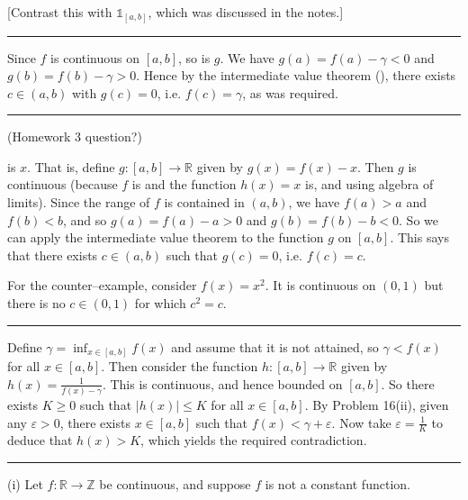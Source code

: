 \documentclass[letterpaper,10pt,english]{jupyterBook}
\begin{document}
{[}Contrast this with \(\mathbb{1}_{[a, b]}\), which was discussed in the notes.{]}


\bigskip\hrule\bigskip


\sphinxAtStartPar
{\hyperref[\detokenize{Problems:id24}]{}} Since \(f\) is continuous on \([a, b]\), so is \(g\). We have \(g(a) = f(a) - \gamma < 0\) and \(g(b) = f(b) - \gamma > 0\). Hence by the intermediate value theorem (), there exists \(c \in (a, b)\) with \(g(c) = 0\), i.e. \(f(c) = \gamma\), as was required.


\bigskip\hrule\bigskip


\sphinxAtStartPar
{\hyperref[\detokenize{Problems:id25}]{}}
(Homework 3 question?)

 is \(x\). That is, define \(g:[a,b]\to\mathbb{R}\) given by \(g(x) = f(x) - x\). Then \(g\) is continuous (because \(f\) is and the function \(h(x)=x\) is, and using algebra of limits). Since the range of \(f\) is contained in \((a, b)\), we have \(f(a) > a\) and \(f(b) < b\), and so \(g(a) = f(a) - a > 0\) and \(g(b) = f(b) - b < 0\). So we can apply the intermediate value theorem to the function \(g\) on \([a,b]\). This says that there exists \(c \in (a, b)\) such that \(g(c) = 0\), i.e. \(f(c) = c\).

For the counter–example, consider \(f(x) = x^2\). It is continuous on \((0, 1)\) but there is no \(c \in (0, 1)\) for which \(c^2 = c\).


\bigskip\hrule\bigskip


\sphinxAtStartPar
{\hyperref[\detokenize{Problems:id26}]{}} Define \(\gamma = \inf_{x \in [a, b]}f(x)\) and assume that it is not attained, so \(\gamma < f(x)\) for all \(x \in [a,b]\). Then consider the function \(h:[a,b]\to \mathbb{R}\) given by \(h(x) = \displaystyle\frac{1}{f(x) - \gamma}\). This is continuous, and hence bounded on \([a, b]\). So there exists \(K \geq 0\) such that \(|h(x)| \leq K\) for all \(x \in [a, b]\). By Problem 16(ii), given any \(\varepsilon > 0\), there exists \(x \in [a, b]\) such that \(f(x) < \gamma + \varepsilon\). Now take \(\varepsilon = \frac{1}{K}\) to deduce that \(h(x) > K\), which yields the required contradiction.


\bigskip\hrule\bigskip


\sphinxAtStartPar
{\hyperref[\detokenize{Problems:id27}]{}} (i) Let \(f:\mathbb{R}\to\mathbb{Z}\) be continuous, and suppose \(f\) is not a constant function.
\end{document}
